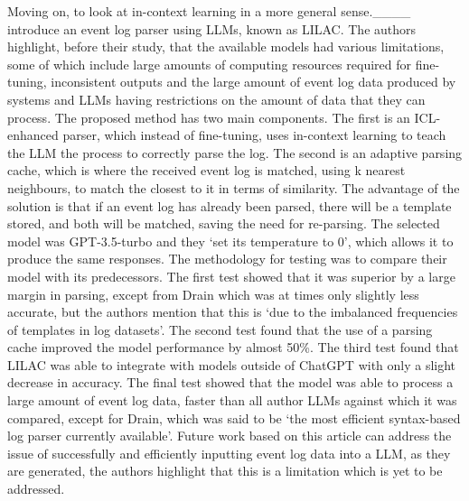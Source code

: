 Moving on, to look at in-context learning in a more general sense.____ introduce an event log parser using LLMs, known as LILAC. The authors highlight, before their study, that the available models had various limitations, some of which include large amounts of computing resources required for fine-tuning, inconsistent outputs and the large amount of event log data produced by systems and LLMs having restrictions on the amount of data that they can process. The proposed method has two main components. The first is an ICL-enhanced parser, which instead of fine-tuning, uses in-context learning to teach the LLM the process to correctly parse the log. The second is an adaptive parsing cache, which is where the received event log is matched, using k nearest neighbours, to match the closest to it in terms of similarity. The advantage of the solution is that if an event log has already been parsed, there will be a template stored, and both will be matched, saving the need for re-parsing. The selected model was GPT-3.5-turbo and they `set its temperature to 0', which allows it to produce the same responses. The methodology for testing was to compare their model with its predecessors. The first test showed that it was superior by a large margin in parsing, except from Drain which was at times only slightly less accurate, but the authors mention that this is `due to the imbalanced frequencies of templates in log datasets'. The second test found that the use of a parsing cache improved the model performance by almost 50\%. The third test found that LILAC was able to integrate with models outside of ChatGPT with only a slight decrease in accuracy. The final test showed that the model was able to process a large amount of event log data, faster than all author LLMs against which it was compared, except for Drain, which was said to be `the most efficient syntax-based log parser currently available'. Future work based on this article can address the issue of successfully and efficiently inputting event log data into a LLM, as they are generated, the authors highlight that this is a limitation which is yet to be addressed. 

